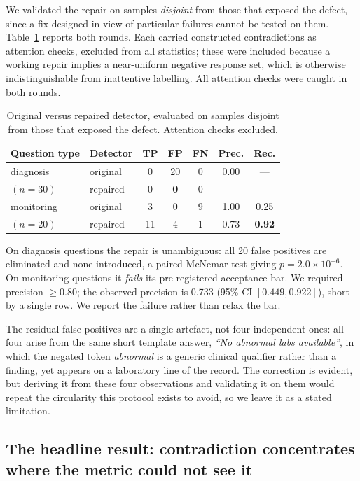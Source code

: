 We validated the repair on samples \emph{disjoint} from those that exposed the
defect, since a fix designed in view of particular failures cannot be tested on
them. Table~\ref{tab:detector-validation} reports both rounds. Each carried
constructed contradictions as attention checks, excluded from all statistics;
these were included because a working repair implies a near-uniform negative
response set, which is otherwise indistinguishable from inattentive labelling.
All attention checks were caught in both rounds.

\begin{table}[t]
\centering
\caption{Original versus repaired detector, evaluated on samples disjoint from
those that exposed the defect. Attention checks excluded.}
\label{tab:detector-validation}
\footnotesize
\setlength{\tabcolsep}{4pt}
\begin{tabular}{llccccc}
\toprule
Question type & Detector & TP & FP & FN & Prec. & Rec. \\
\midrule
diagnosis      & original  & 0  & 20 & 0 & 0.00 & --- \\
$(n=30)$       & repaired  & 0  & \textbf{0}  & 0 & --- & --- \\
\midrule
monitoring     & original  & 3  & 0  & 9 & 1.00 & 0.25 \\
$(n=20)$       & repaired  & 11 & 4  & 1 & 0.73 & \textbf{0.92} \\
\bottomrule
\end{tabular}
\end{table}

On diagnosis questions the repair is unambiguous: all 20 false positives are
eliminated and none introduced, a paired McNemar test giving $p = 2.0\times
10^{-6}$. On monitoring questions it \emph{fails} its pre-registered acceptance
bar. We required precision $\geq 0.80$; the observed precision is 0.733 (95\%
CI $[0.449, 0.922]$), short by a single row. We report the failure rather than
relax the bar.

The residual false positives are a single artefact, not four independent ones:
all four arise from the same short template answer, \emph{``No abnormal labs
available''}, in which the negated token \emph{abnormal} is a generic clinical
qualifier rather than a finding, yet appears on a laboratory line of the record.
The correction is evident, but deriving it from these four observations and
validating it on them would repeat the circularity this protocol exists to
avoid, so we leave it as a stated limitation.

\subsection{The headline result: contradiction concentrates where the metric
could not see it}

